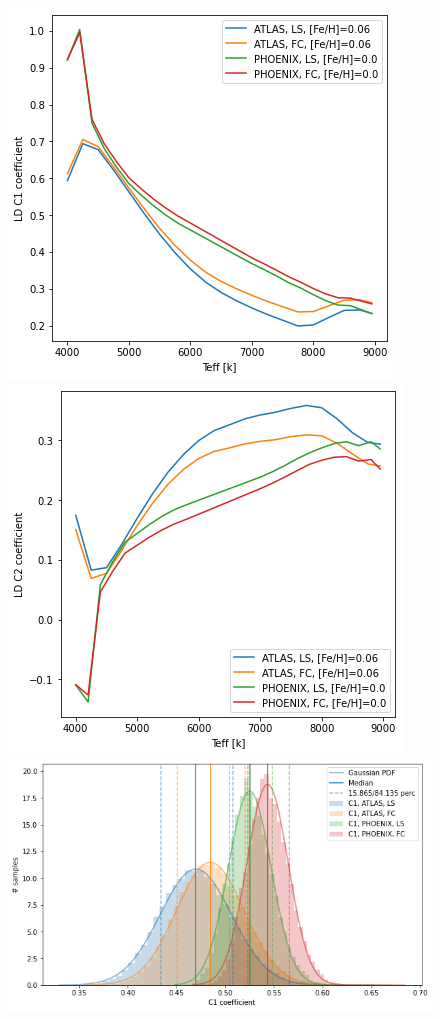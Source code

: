 \documentclass[a4paper,11pt,twocolumn]{article}
\begin{document}
\begin{figure}[H]
    \centering  
    \includegraphics[scale=0.5, angle=0]{../pictures/Claret2011/c1.png}
    \includegraphics[scale=0.5, angle=0]{../pictures/Claret2011/c2.png}
    \includegraphics[scale=0.35, angle=0]{../pictures/Claret2011/c1_comp.png}

\end{figure}
\end{document}
